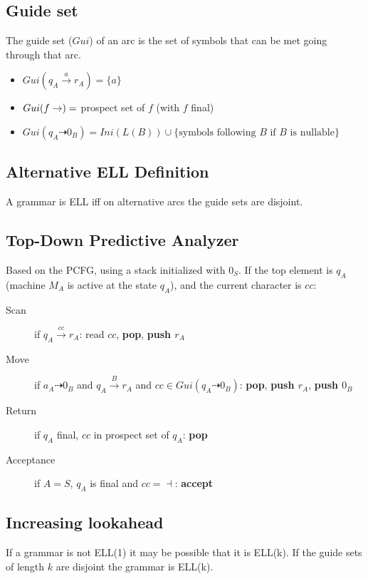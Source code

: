 \subsection{Guide set}
The guide set ($Gui$) of an arc is the set of symbols that can be met going through that arc.
\begin{itemize}
    \item $Gui(q_A\xrightarrow{a}r_A) = \{a\}$
    \item $Gui(f\rightarrow) =$ prospect set of $f$ (with $f$ final)
    \item $Gui(q_A\dashrightarrow 0_B) = Ini(L(B)) \cup \{\text{symbols following $B$ if $B$ is nullable}\}$
\end{itemize}

\subsection{Alternative ELL Definition}
A grammar is ELL iff on alternative arcs the guide sets are disjoint.

\subsection{Top-Down Predictive Analyzer}
Based on the PCFG, using a stack initialized with $0_S$. If the top element is $q_A$ (machine $M_A$ is active at the state $q_A$), and the current character is $cc$:
\begin{description}
    \item[Scan] if $q_A \xrightarrow{cc} r_A$: read $cc$, \textbf{pop}, \textbf{push $r_A$}
    \item[Move] if $a_A \dashrightarrow 0_B$ and $q_A \xrightarrow{B} r_A$ and $cc \in Gui(q_A \dashrightarrow 0_B)$: \textbf{pop}, \textbf{push $r_A$}, \textbf{push $0_B$}
    \item[Return] if $q_A$ final, $cc$ in prospect set of $q_A$: \textbf{pop}
    \item[Acceptance] if $A=S$, $q_A$ is final and $cc = \dashv$: \textbf{accept}
\end{description}

\subsection{Increasing lookahead}
If a grammar is not ELL(1) it may be possible that it is ELL(k).
If the guide sets of length $k$ are disjoint the grammar is ELL(k).
